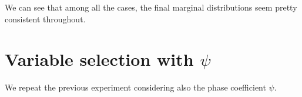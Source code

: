 \documentclass[a4paper,12pt]{article}
\theoremstyle{definition}
\begin{document}
We can see that among all the cases, the final marginal distributions seem pretty consistent throughout.

\section{Variable selection with \(\psi\)}
We repeat the previous experiment considering also the phase coefficient \(\psi\). 

\bigskip

\end{document}

